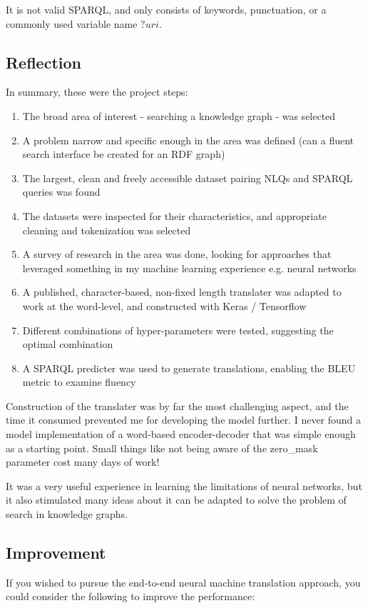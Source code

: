 \documentclass[12pt]{article}
\begin{document}
It is not valid SPARQL, and only consists of keywords, punctuation, or a commonly
used variable name \(?uri\).

\subsection{Reflection}\label{reflection}

In summary, these were the project steps:

\begin{enumerate}
  \item 
    The broad area of interest - searching a knowledge graph - was selected
  \item 
    A problem narrow and specific enough in the area was defined (can a fluent
    search interface be created for an RDF graph)
  \item
    The largest, clean and freely accessible dataset pairing NLQs and SPARQL
    queries was found
  \item
    The datasets were inspected for their characteristics, and appropriate cleaning
    and tokenization was selected
  \item
    A survey of research in the area was done, looking for approaches that
    leveraged something in my machine learning experience e.g. neural networks
  \item
    A published, character-based, non-fixed length translater was adapted to
    work at the word-level, and constructed with Keras / Tensorflow
  \item 
    Different combinations of hyper-parameters were tested, suggesting the 
    optimal combination
  \item
    A SPARQL predicter was used to generate translations, enabling the BLEU 
    metric to examine fluency
\end{enumerate}

Construction of the translater was by far the most challenging aspect, and 
the time it consumed prevented me for developing the model further. I never
found a model implementation of a word-based encoder-decoder that was simple
enough as a starting point. Small things like not being aware of the zero\_mask
parameter cost many days of work!

It was a very useful experience in learning the limitations of neural networks,
but it also stimulated many ideas about it can be adapted to solve the problem
of search in knowledge graphs.

\subsection{Improvement}\label{improvement}
If you wished to pursue the end-to-end neural machine translation 
approach, you could consider the following to improve the performance:
\end{document}
